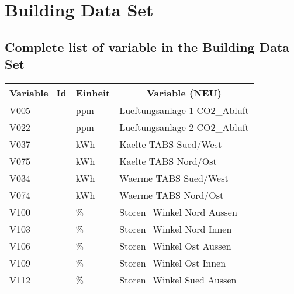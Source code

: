 
\chapter{Building Data Set} %

\label{AppendixA} %

\section{Complete list of variable in the Building Data Set}

\begin{table}[htbp]
  \centering
  \scriptsize
    \begin{tabular}{|l|l|l|}
    \hline
    \multicolumn{1}{|c|}{\textbf{Variable\_Id}} & \multicolumn{1}{c|}{\textbf{Einheit}} & \multicolumn{1}{c|}{\textbf{Variable (NEU)}} \bigstrut\\
    \hline
    \rowcolor[rgb]{ .863,  .902,  .945} V005 & ppm  & Lueftungsanlage 1 CO2\_Abluft \bigstrut\\
    \hline
    \rowcolor[rgb]{ .863,  .902,  .945} V022 & ppm  & Lueftungsanlage 2 CO2\_Abluft \bigstrut\\
    \hline
    \rowcolor[rgb]{ .992,  .914,  .851} V037 & kWh  & Kaelte TABS Sued/West \bigstrut\\
    \hline
    \rowcolor[rgb]{ .992,  .914,  .851} V075 & kWh  & Kaelte TABS Nord/Ost \bigstrut\\
    \hline
    \rowcolor[rgb]{ .992,  .914,  .851} V034 & kWh  & Waerme TABS Sued/West \bigstrut\\
    \hline
    \rowcolor[rgb]{ .992,  .914,  .851} V074 & kWh  & Waerme TABS Nord/Ost \bigstrut\\
    \hline
    \rowcolor[rgb]{ .863,  .902,  .945} V100 & \%   & Storen\_Winkel Nord Aussen \bigstrut\\
    \hline
    \rowcolor[rgb]{ .863,  .902,  .945} V103 & \%   & Storen\_Winkel Nord Innen \bigstrut\\
    \hline
    \rowcolor[rgb]{ .863,  .902,  .945} V106 & \%   & Storen\_Winkel Ost Aussen \bigstrut\\
    \hline
    \rowcolor[rgb]{ .863,  .902,  .945} V109 & \%   & Storen\_Winkel Ost Innen \bigstrut\\
    \hline
    \rowcolor[rgb]{ .863,  .902,  .945} V112 & \%   & Storen\_Winkel Sued Aussen \bigstrut\\

\end{tabular}
\end{table}

